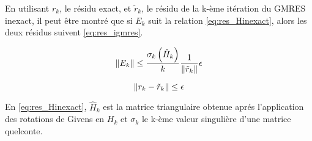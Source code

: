     En utilisant $r_{k}$, le résidu exact, et $\tilde{r}_{k}$, le résidu de la k-ème itération du GMRES inexact, il peut être montré \cite{simoncini2003theory} que si $E_{k}$ suit la relation \ref{eq:res_Hinexact}, alors les deux résidus suivent \ref{eq:res_igmres}.


    \begin{equation}\label{eq:res_Hinexact}
        \left\lVert E_{k}\right\rVert \leq \frac{\sigma_{k} \left( \hat{H}_{k} \right) }{k} \frac{1}{\left\lVert\tilde{r}_{k}\right\rVert} \epsilon
    \end{equation}

    \begin{equation}\label{eq:res_igmres}
        \left\lVert r_{k}-\tilde{r}_{k}\right\rVert \leq \epsilon
    \end{equation}

    En \ref{eq:res_Hinexact}, $\hat{H}_{k}$ est la matrice triangulaire obtenue aprés l'application des rotations de Givens en $H_{k}$ et $\sigma_{k}$ le k-ème valeur singulière d'une matrice quelconte.